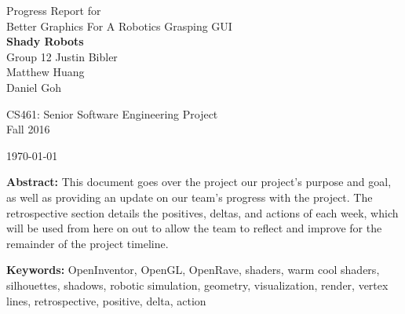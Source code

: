 \documentclass[10pt,journal,compsoc,draftclsnofoot]{IEEEtran}
\begin{document}
\onecolumn

\begin{titlepage}
\null
\vspace{15mm}

\begin{flushleft}
\begin{bfseries}
	\vskip2mm
	\Huge{Progress Report for\\ Better Graphics For A Robotics Grasping GUI}\\
	\vspace{15mm}
	\textbf{\huge Shady Robots} \\
	\vskip2mm
	\large{Group 12}
	\vskip5mm
	\Large{Justin Bibler \\
	Matthew Huang \\
	Daniel Goh \\}
\end{bfseries}

\vspace{15mm}
\Large{CS461: Senior Software Engineering Project} \\
\Large{Fall 2016} \\

\vspace{5mm}

\today

\vfill

\begin{normalsize}
{\bf Abstract:}
This document goes over the project our project's purpose and goal, as well as providing an update on our team's progress with the project.
The retrospective section details the positives, deltas, and actions of each week, which will be used from here on out to allow the team to reflect and improve for the remainder of the project timeline.

{\bf Keywords:} OpenInventor, OpenGL, OpenRave, shaders, warm cool shaders, silhouettes, shadows, robotic simulation, geometry, visualization, render, vertex lines, retrospective, positive, delta, action
\end{normalsize}
\end{flushleft}

\newpage

\end{titlepage}
\end{document}
